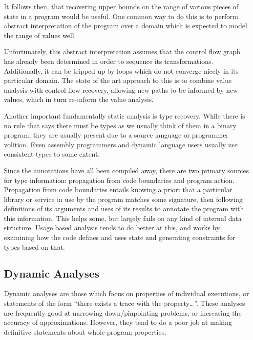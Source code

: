 It follows then, that recovering upper bounds on the range of various pieces of state in a program would be useful.
One common way to do this is to perform abstract interpretation of the program over a domain which is expected to model the range of values well.\cite{vsa}

Unfortunately, this abstract interpretation assumes that the control flow graph has already been determined in order to sequence its transformations.
Additionally, it can be tripped up by loops which do not converge nicely in its particular domain.
The state of the art approach to this is to combine value analysis with control flow recovery, allowing new paths to be informed by new values, which in turn re-inform the value analysis\cite{jakstab}.

Another important fundamentally static analysis is type recovery.
While there is no rule that says there must be types as we usually think of them in a binary program, they are usually present due to a source language or programmer volition.
Even assembly programmers and dynamic language users usually use consistent types to some extent.

Since the annotations have all been compiled away, there are two primary sources for type information: propagation from code boundaries and program action.
Propagation\cite{howard} from code boundaries entails knowing a priori that a particular library or service in use by the program matches some signature, then following definitions of its arguments and uses of its results to annotate the program with this information.
This helps some, but largely fails on any kind of internal data structure.
Usage based analysis\cite{tie,bitr} tends to do better at this, and works by examining how the code defines and uses state and generating constraints for types based on that.

\subsection{Dynamic Analyses}
Dynamic analyses are those which focus on properties of individual executions, or statements of the form ``there exists a trace with the property\ldots''.
These analyses are frequently good at narrowing down/pinpointing problems, or increasing the accuracy of approximations.
However, they tend to do a poor job at making definitive statements about whole-program properties.

